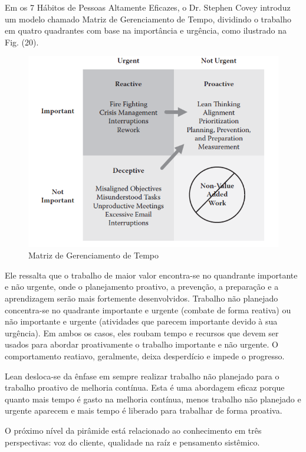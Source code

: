 \begin{anexosenv}
Em os 7 Hábitos de Pessoas Altamente Eficazes, o Dr. Stephen Covey introduz um modelo chamado Matriz de Gerenciamento de Tempo, dividindo o trabalho em quatro quadrantes com base na importância e urgência, como ilustrado na Fig. (20).

\begin{figure}[H]
		\centering
		\label{fig03}
			\includegraphics[scale=0.9]{figuras/matrizcomportamento.png}
		\caption{Matriz de Gerenciamento de Tempo \cite{bell2011}}
\end{figure}

Ele ressalta que o trabalho de maior valor encontra-se no quandrante importante e não urgente, onde o planejamento proativo, a prevenção, a preparação e a aprendizagem serão mais fortemente desenvolvidos. Trabalho não planejado concentra-se no quadrante importante e urgente (combate de forma reativa) ou não importante e urgente (atividades que parecem importante devido à sua urgência). Em ambos os casos, eles roubam tempo e recursos que devem ser usados para abordar proativamente o trabalho importante e não urgente. O comportamento reatiavo, geralmente, deixa desperdício e impede o progresso. 

Lean desloca-se da ênfase em sempre realizar trabalho não planejado para o trabalho proativo de melhoria contínua. Esta é uma abordagem eficaz porque quanto mais tempo é gasto na melhoria contínua, menos trabalho não planejado e urgente aparecem e mais tempo é liberado para trabalhar de forma proativa.

O próximo nível da pirâmide está relacionado ao conhecimento em três perspectivas: voz do cliente, qualidade na raíz e pensamento sistêmico.


\end{anexosenv}
